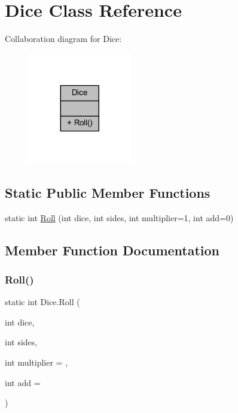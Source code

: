 \hypertarget{class_dice}{}\section{Dice Class Reference}
\label{class_dice}


Collaboration diagram for Dice\+:\nopagebreak
\begin{figure}[H]
\begin{center}
\leavevmode
\includegraphics[width=128pt]{class_dice__coll__graph}
\end{center}
\end{figure}
\subsection*{Static Public Member Functions}
\begin{DoxyCompactItemize}
\item 
static int \mbox{\hyperlink{class_dice_a35ef280974d277d579faaec918e8cecc}{Roll}} (int dice, int sides, int multiplier=1, int add=0)
\end{DoxyCompactItemize}


\subsection{Member Function Documentation}
\mbox{\label{class_dice_a35ef280974d277d579faaec918e8cecc}} 
\subsubsection{\texorpdfstring{Roll()}{Roll()}}
{\footnotesize\ttfamily static int Dice.\+Roll (\begin{DoxyParamCaption}\item[{int}]{dice,  }\item[{int}]{sides,  }\item[{int}]{multiplier = {},  }\item[{int}]{add = {} }\end{DoxyParamCaption})\hspace{0.3cm}{\ttfamily [static]}}

